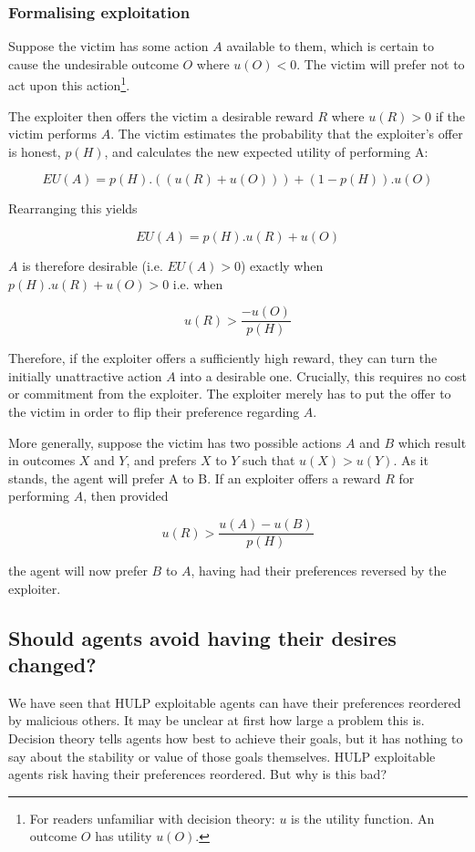 \documentclass{article}
\begin{document}
\subsubsection{Formalising exploitation}

Suppose the victim has some action \(A\) available to them, which is certain to cause the undesirable outcome \(O\) where \(u(O) < 0\). The victim will prefer not to act upon this action\footnote{For readers unfamiliar with decision theory: \(u\) is the utility function. An outcome \(O\) has utility \(u(O)\).}.

The exploiter then offers the victim a desirable reward \(R\) where \(u(R) > 0\) if the victim performs \(A\). The victim estimates the probability that the exploiter's offer is honest, \(p(H)\), and calculates the new expected utility of performing A:

\[EU(A) = p(H).((u(R)+u(O))) + (1-p(H)).u(O)\]

Rearranging this yields

\[EU(A) = p(H).u(R) + u(O)\]

\(A\) is therefore desirable (i.e. \(EU(A)>0\)) exactly when \(p(H).u(R) + u(O) > 0\) i.e. when

\[u(R) > \frac{-u(O)}{p(H)}\]

Therefore, if the exploiter offers a sufficiently high reward, they can turn the initially unattractive action \(A\) into a desirable one. Crucially, this requires no cost or commitment from the exploiter. The exploiter merely has to put the offer to the victim in order to flip their preference regarding \(A\).

More generally, suppose the victim has two possible actions \(A\) and \(B\) which result in outcomes \(X\) and \(Y\), and prefers \(X\) to \(Y\) such that \(u(X)>u(Y)\). As it stands, the agent will prefer A to B. If an exploiter offers a reward \(R\) for performing \(A\), then provided

\[u(R) > \frac{u(A)-u(B)}{p(H)}\]

the agent will now prefer \(B\) to \(A\), having had their preferences reversed by the exploiter.

\subsection{Should agents avoid having their desires changed?}

We have seen that HULP exploitable agents can have their preferences reordered by malicious others. It may be unclear at first how large a problem this is. Decision theory tells agents how best to achieve their goals, but it has nothing to say about the stability or value of those goals themselves. HULP exploitable agents risk having their preferences reordered. But why is this bad?
\end{document}
